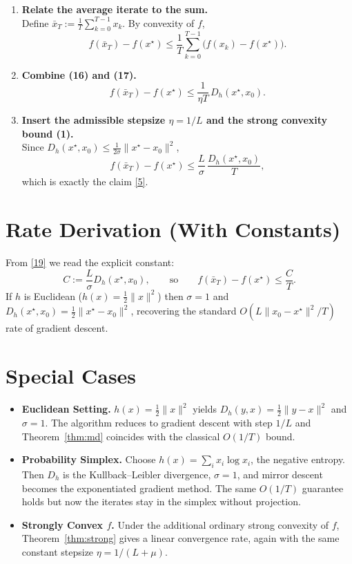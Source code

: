\documentclass[11pt]{article}
\begin{document}
\begin{enumerate}[label=[Step \arabic*], leftmargin=*, align=left]
\item \textbf{Relate the average iterate to the sum.}\\
Define $\bar x_{T}:=\frac{1}{T}\sum_{k=0}^{T-1}x_{k}$. By convexity of $f$,
\[
f(\bar x_{T})-f(x^{\star})\le \frac{1}{T}\sum_{k=0}^{T-1}\big(f(x_{k})-f(x^{\star})\big).
\tag{17}
\]

\item \textbf{Combine (16) and (17).}\\
\[
f(\bar x_{T})-f(x^{\star})
\le \frac{1}{\eta T}\,D_{h}(x^{\star},x_{0}). \tag{18}
\]

\item \textbf{Insert the admissible stepsize $\eta=1/L$ and the strong convexity
bound (1).}\\
Since $D_{h}(x^{\star},x_{0})\le \frac{1}{2\sigma}\|x^{\star}-x_{0}\|^{2}$,
\[
f(\bar x_{T})-f(x^{\star})
\le \frac{L}{\sigma}\,\frac{D_{h}(x^{\star},x_{0})}{T},
\tag{19}
\]
which is exactly the claim \eqref{5}. \hfill\qedhere
\end{enumerate}

\section*{Rate Derivation (With Constants)}
From \eqref{19} we read the explicit constant:
\[
C:=\frac{L}{\sigma}D_{h}(x^{\star},x_{0}),
\qquad\text{so}\qquad
f(\bar x_{T})-f(x^{\star})\le \frac{C}{T}.
\]
If $h$ is Euclidean ($h(x)=\tfrac12\|x\|^{2}$) then $\sigma=1$ and
$D_{h}(x^{\star},x_{0})=\tfrac12\|x^{\star}-x_{0}\|^{2}$, recovering the
standard $O(L\|x_{0}-x^{\star}\|^{2}/T)$ rate of gradient descent.

\section*{Special Cases}
\begin{itemize}
\item \textbf{Euclidean Setting.} $h(x)=\frac12\|x\|^{2}$ yields
$D_{h}(y,x)=\frac12\|y-x\|^{2}$ and $\sigma=1$. The algorithm reduces to
gradient descent with step $1/L$ and Theorem~\ref{thm:md} coincides with
the classical $O(1/T)$ bound.
\item \textbf{Probability Simplex.} Choose $h(x)=\sum_{i}x_{i}\log x_{i}$,
the negative entropy. Then $D_{h}$ is the Kullback–Leibler divergence,
$\sigma=1$, and mirror descent becomes the exponentiated gradient method.
The same $O(1/T)$ guarantee holds but now the iterates stay in the simplex
without projection.
\item \textbf{Strongly Convex $f$.} Under the additional ordinary strong
convexity of $f$, Theorem~\ref{thm:strong} gives a linear convergence rate,
again with the same constant stepsize $\eta=1/(L+\mu)$.
\end{itemize}
\end{document}
